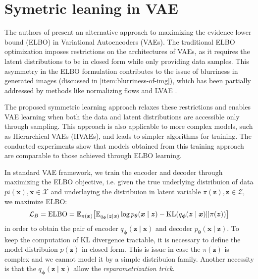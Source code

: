 \section{Symetric leaning in VAE}
\label{sec:symmetric_learning}
The authors of \cite{sym-learning-2023} present an alternative approach to maximizing the evidence lower bound (ELBO)
in Variational Autoencoders (VAEs). The traditional ELBO optimization imposes restrictions on the architectures of 
VAEs, as it requires the latent distributions to be in closed form while only providing data samples. This asymmetry in
the ELBO formulation contributes to the issue of blurriness in generated images (discussed in \ref{item:blurriness-of-img}),
which has been partially addressed by methods like normalizing flows \cite{nf-2015} and LVAE \cite{lvae-2016}.

The proposed symmetric learning approach relaxes these restrictions and enables VAE learning when both the data and 
latent distributions are accessible only through sampling. This approach is also applicable to more complex models, such 
as Hierarchical VAEs (HVAEs), and leads to simpler algorithms for training. The conducted experiments show that models obtained 
from this training approach are comparable to those achieved through ELBO learning.

In standard VAE framework, we train the encoder  and decoder through maximizing the ELBO objective, i.e.
given the true underlying distribuion of data $pi(\boldsymbol{x}), \boldsymbol{x} \in \mathcal{X}$ and underlaying
the distribuion in latent variable $\pi(\boldsymbol{z}), \boldsymbol{z} \in \mathcal{Z}$, we maximize ELBO:
$$
\mathcal{L}_{B} = \mathrm{ELBO} = \operatorname{\mathbb{E}}_{\pi(\boldsymbol{x})} \bigl[ \operatorname{\mathbb{E}}_{q_{\boldsymbol{\phi}}(\boldsymbol{z} \mid \boldsymbol{x})} 
\log p_{\boldsymbol{\theta}}(\boldsymbol{x} \mid \boldsymbol{z}) - \mathrm{KL} (q_{\boldsymbol{\phi}}(\boldsymbol{z} \mid \boldsymbol{x}) || 
\pi(\boldsymbol{z})) \bigr]
$$
in order to obtain the pair of encoder $q_{\boldsymbol{\phi}}(\boldsymbol{z} \mid \boldsymbol{x})$ and decoder
$p_{\boldsymbol{\theta}}(\boldsymbol{x} \mid \boldsymbol{z})$. To keep the computation of KL divergence tractable, it is necessary to define
the model distribuion $p(\boldsymbol{z})$ in closed form. This is issue in case the $\pi(\boldsymbol{z})$ is complex and we cannot model 
it by a simple distribuion family. Another necessity is that the $q_{\boldsymbol{\phi}}(\boldsymbol{z} \mid \boldsymbol{x})$ allow the 
\textit{reparametrization trick}. 

